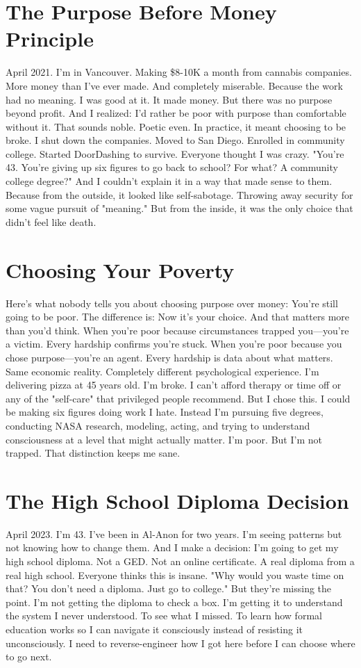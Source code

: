 \section{The Purpose Before Money Principle}

April 2021. I'm in Vancouver. Making \$8-10K a month from cannabis companies. More money than I've ever made. And completely miserable.
Because the work had no meaning. I was good at it. It made money. But there was no purpose beyond profit.
And I realized: I'd rather be poor with purpose than comfortable without it.
That sounds noble. Poetic even.
In practice, it meant choosing to be broke.
I shut down the companies. Moved to San Diego. Enrolled in community college. Started DoorDashing to survive.
Everyone thought I was crazy.
"You're 43. You're giving up six figures to go back to school? For what? A community college degree?"
And I couldn't explain it in a way that made sense to them.
Because from the outside, it looked like self-sabotage. Throwing away security for some vague pursuit of "meaning."
But from the inside, it was the only choice that didn't feel like death.

\section{Choosing Your Poverty}

Here's what nobody tells you about choosing purpose over money:
You're still going to be poor. The difference is: Now it's your choice.
And that matters more than you'd think.
When you're poor because circumstances trapped you—you're a victim. Every hardship confirms you're stuck.
When you're poor because you chose purpose—you're an agent. Every hardship is data about what matters.
Same economic reality. Completely different psychological experience.
I'm delivering pizza at 45 years old. I'm broke. I can't afford therapy or time off or any of the "self-care" that privileged people recommend.
But I chose this.
I could be making six figures doing work I hate. Instead I'm pursuing five degrees, conducting NASA research, modeling, acting, and trying to understand consciousness at a level that might actually matter.
I'm poor. But I'm not trapped.
That distinction keeps me sane.

\section{The High School Diploma Decision}

April 2023. I'm 43. I've been in Al-Anon for two years. I'm seeing patterns but not knowing how to change them.
And I make a decision:
I'm going to get my high school diploma.
Not a GED. Not an online certificate. A real diploma from a real high school.
Everyone thinks this is insane.
"Why would you waste time on that? You don't need a diploma. Just go to college."
But they're missing the point.
I'm not getting the diploma to check a box. I'm getting it to understand the system I never understood. To see what I missed. To learn how formal education works so I can navigate it consciously instead of resisting it unconsciously.
I need to reverse-engineer how I got here before I can choose where to go next.

